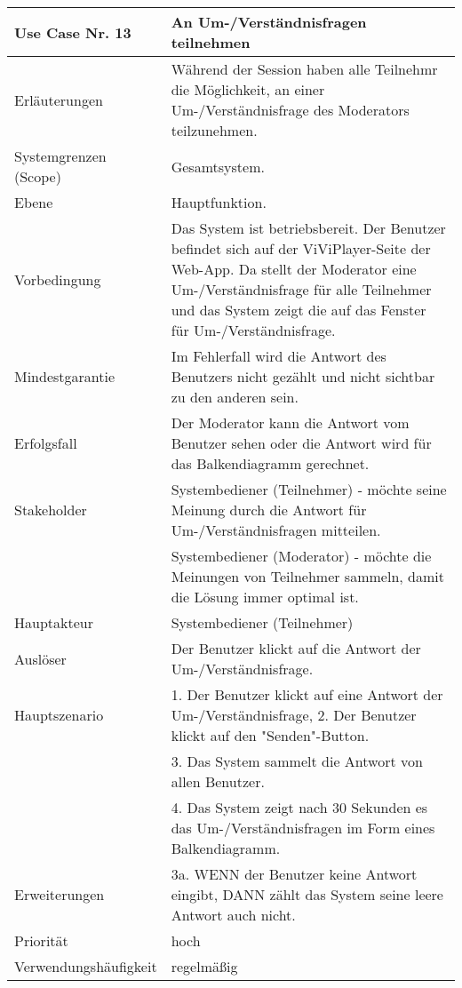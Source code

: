 \begin{tabularx}{\linewidth}{|l|X|}
	\hline
	Use Case Nr. 13			& \textbf{An Um-/Verständnisfragen teilnehmen} \\ \hline
	Erläuterungen			& Während der Session haben alle Teilnehmr die Möglichkeit, an einer 
							  Um-/Verständnisfrage des Moderators teilzunehmen. \\ \hline
	Systemgrenzen (Scope)	& Gesamtsystem. \\ \hline
	Ebene					& Hauptfunktion. \\ \hline
	Vorbedingung			& Das System ist betriebsbereit. Der Benutzer befindet sich auf der 
							  ViViPlayer-Seite der Web-App. Da stellt der Moderator eine Um-/Verständnisfrage für alle Teilnehmer und das System zeigt die auf das Fenster für Um-/Verständnisfrage. \\ \hline
	Mindestgarantie			& Im Fehlerfall wird die Antwort des Benutzers nicht gezählt und 
							  nicht sichtbar zu den anderen sein. \\ \hline
	Erfolgsfall				& Der Moderator kann die Antwort vom Benutzer sehen oder die Antwort 
							  wird für das Balkendiagramm gerechnet. \\ \hline
	Stakeholder				& Systembediener (Teilnehmer) - möchte seine Meinung durch die 
							  Antwort für Um-/Verständnisfragen mitteilen. \\ 
							& Systembediener (Moderator) - möchte die Meinungen von Teilnehmer 
							  sammeln, damit die Lösung immer optimal ist. \\ \hline
	Hauptakteur				& Systembediener (Teilnehmer) \\ \hline
	Auslöser				& Der Benutzer klickt auf die Antwort der Um-/Verständnisfrage. \\ 
							  \hline	
	Hauptszenario			& 1. Der Benutzer klickt auf eine Antwort der Um-/Verständnisfrage, 
	                          2. Der Benutzer klickt auf den "Senden"-Button. \\
							& 3. Das System sammelt die Antwort von allen Benutzer. \\
							& 4. Das System zeigt nach 30 Sekunden es das Um-/Verständnisfragen im 
							  Form eines Balkendiagramm. \\ \hline
	Erweiterungen			& 3a. WENN der Benutzer keine Antwort eingibt, DANN zählt das System 
							  seine leere Antwort auch nicht. \\ \hline
	Priorität				& hoch \\ \hline
	Verwendungshäufigkeit	& regelmäßig \\ \hline
\end{tabularx}

